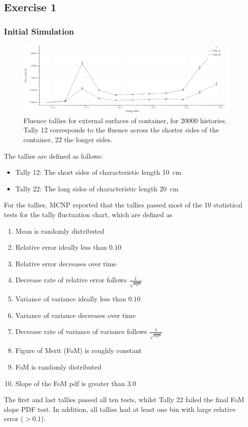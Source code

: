 \documentclass{article}
\begin{document}
  \subsection{Exercise 1}
    \subsubsection{Initial Simulation}
      \begin{figure}[htb]
        \includegraphics[width=\textwidth]{tallies.png}
        \caption{Fluence tallies for external surfaces of container, for \num{20000} histories. Tally 12 corresponds to the fluence across the shorter sides of the container, 22 the longer sides.}
        \label{fig:tallies_20000}
      \end{figure}

    The tallies are defined as follows:
    \begin{itemize}
      \item Tally 12: The short sides of characteristic length \SI{10}{\cm}
      \item Tally 22: The long sides of characteristic length \SI{20}{\cm}
    \end{itemize}

    For the tallies, MCNP reported that the tallies passed most of the 10 statistical tests for the tally fluctuation chart, which are defined as
    \begin{enumerate}
      \item Mean is randomly distributed
      \item Relative error ideally less than $0.10$
      \item Relative error decreases over time
      \item Decrease rate of relative error follows $\frac{1}{\sqrt{\text{nps}}}$
      \item Variance of variance ideally less than $0.10$
      \item Variance of variance decreases over time
      \item Decrease rate of variance of variance follows $\frac{1}{\sqrt{\text{nps}}}$
      \item Figure of Merit (FoM) is roughly constant
      \item FoM is randomly distributed
      \item Slope of the FoM pdf is greater than $3.0$
    \end{enumerate}
    The first and last tallies passed all ten tests, whilst Tally 22 failed the final FoM slope PDF test. In addition, all tallies had at least one bin with large relative error ($>0.1$).
\end{document}
